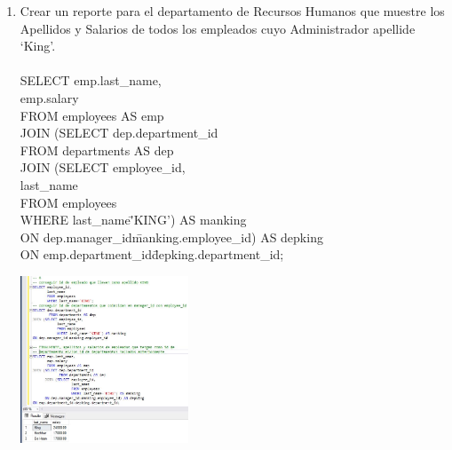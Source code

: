 \begin{enumerate}[1.]
	\item Crear un reporte para el departamento de Recursos Humanos que muestre los Apellidos y Salarios de todos los empleados cuyo Administrador apellide ‘King’.
	\\
	\\SELECT emp.last\_name, \\
	   emp.salary \\
	   FROM employees AS emp \\
JOIN (SELECT dep.department\_id \\
			 FROM departments AS dep \\
	  JOIN (SELECT employee\_id, \\
			       last\_name \\
				   FROM employees \\
				   WHERE last\_name\='KING') AS manking \\
	  ON dep.manager\_id\=manking.employee\_id) AS depking \\
ON emp.department\_id\=depking.department\_id; \\
	\begin{center}
	\includegraphics[width=5cm]{./Imagenes/actividad0906} 
	\end{center}


\end{enumerate}
